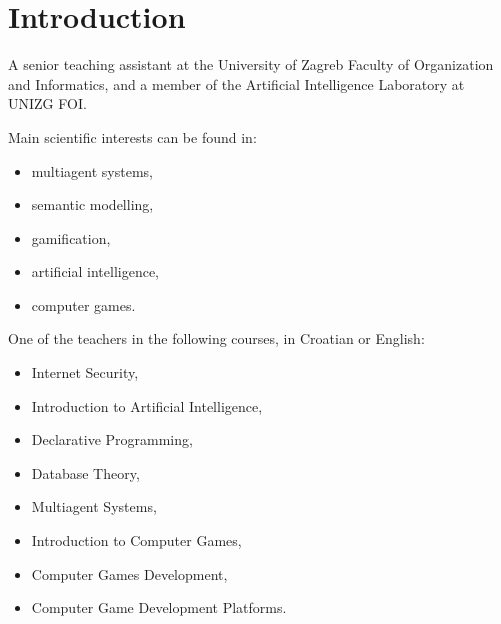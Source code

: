 \section{Introduction}


\begin{frame}{\insertsection}
    A senior teaching assistant at the University of Zagreb \alert{Faculty of Organization and Informatics}, and a member of the Artificial Intelligence Laboratory at UNIZG FOI.
    
    Main scientific interests can be found in:
    \begin{itemize}
        \item multiagent systems,
        \item semantic modelling,
        \item gamification,
        \item artificial intelligence,
        \item computer games.
    \end{itemize}
\end{frame}

\begin{frame}{\insertsection}
    One of the teachers in the following courses, in Croatian or English:
    \begin{multicols}{2}
        \begin{itemize}
            \item Internet Security,
            \item Introduction to Artificial Intelligence,
            \item Declarative Programming,
            \item Database Theory,
            \item Multiagent Systems,
            \item Introduction to Computer Games,
            \item Computer Games Development,
            \item Computer Game Development Platforms.
        \end{itemize}
    \end{multicols}
\end{frame}

